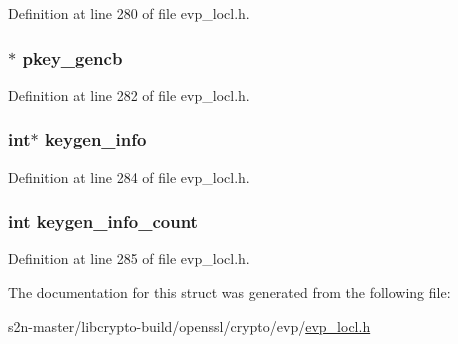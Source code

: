 Definition at line 280 of file evp\+\_\+locl.\+h.

\subsubsection[{\texorpdfstring{pkey\+\_\+gencb}{pkey_gencb}}]{$\ast$ pkey\+\_\+gencb}\hypertarget{structevp__pkey__ctx__st_a1a7a67ebe3f6fc147e7b00c077cda412}{}\label{structevp__pkey__ctx__st_a1a7a67ebe3f6fc147e7b00c077cda412}


Definition at line 282 of file evp\+\_\+locl.\+h.

\subsubsection[{\texorpdfstring{keygen\+\_\+info}{keygen_info}}]{\setlength{\rightskip}{0pt plus 5cm}int$\ast$ keygen\+\_\+info}\hypertarget{structevp__pkey__ctx__st_af985dc1be4859bbef3dbe99690d3d59e}{}\label{structevp__pkey__ctx__st_af985dc1be4859bbef3dbe99690d3d59e}


Definition at line 284 of file evp\+\_\+locl.\+h.

\subsubsection[{\texorpdfstring{keygen\+\_\+info\+\_\+count}{keygen_info_count}}]{\setlength{\rightskip}{0pt plus 5cm}int keygen\+\_\+info\+\_\+count}\hypertarget{structevp__pkey__ctx__st_a687cd07265611acedb5adf7765039976}{}\label{structevp__pkey__ctx__st_a687cd07265611acedb5adf7765039976}


Definition at line 285 of file evp\+\_\+locl.\+h.



The documentation for this struct was generated from the following file\+:\begin{DoxyCompactItemize}
\item 
s2n-\/master/libcrypto-\/build/openssl/crypto/evp/\hyperlink{evp__locl_8h}{evp\+\_\+locl.\+h}\end{DoxyCompactItemize}
